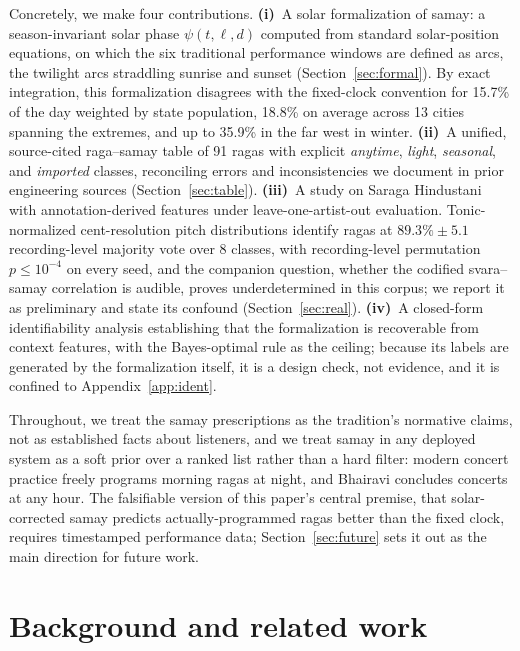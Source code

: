 \documentclass[11pt]{article}
\begin{document}
Concretely, we make four contributions. \textbf{(i)}~A solar formalization of
samay: a season-invariant solar phase $\psi(t,\ell,d)$ computed from standard
solar-position equations, on which the six traditional performance windows
are defined as arcs, the twilight arcs straddling sunrise and sunset
(Section~\ref{sec:formal}). By exact integration, this formalization
disagrees with the fixed-clock convention for 15.7\% of the day weighted by
state population, 18.8\% on average across 13 cities spanning the extremes,
and up to 35.9\% in the far west in winter. \textbf{(ii)}~A unified,
source-cited raga--samay table of 91 ragas with explicit \emph{anytime},
\emph{light}, \emph{seasonal}, and \emph{imported} classes, reconciling
errors and inconsistencies we document in prior engineering sources
(Section~\ref{sec:table}). \textbf{(iii)}~A study on Saraga
Hindustani~\cite{saraga} with annotation-derived features under
leave-one-artist-out evaluation. Tonic-normalized cent-resolution pitch
distributions identify ragas at $89.3\% \pm 5.1$ recording-level majority
vote over 8 classes, with recording-level permutation $p \le 10^{-4}$ on
every seed, and the companion question, whether the codified svara--samay
correlation is audible, proves underdetermined in this corpus; we report it
as preliminary and state its confound (Section~\ref{sec:real}).
\textbf{(iv)}~A closed-form identifiability analysis establishing that the
formalization is recoverable from context features, with the Bayes-optimal
rule as the ceiling; because its labels are generated by the formalization
itself, it is a design check, not evidence, and it is confined to
Appendix~\ref{app:ident}.

Throughout, we treat the samay prescriptions as the tradition's normative
claims, not as established facts about listeners, and we treat samay in any
deployed system as a soft prior over a ranked list rather than a hard filter:
modern concert practice freely programs morning ragas at night, and Bhairavi
concludes concerts at any hour. The falsifiable version of this paper's
central premise, that solar-corrected samay predicts actually-programmed
ragas better than the fixed clock, requires timestamped performance data;
Section~\ref{sec:future} sets it out as the main direction for future work.

\section{Background and related work}\label{sec:related}
\end{document}

